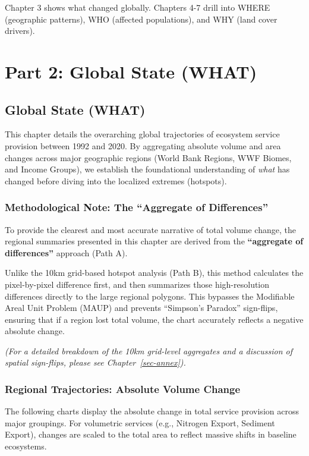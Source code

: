 \documentclass[
  letterpaper,
  DIV=11,
  numbers=noendperiod]{scrreprt}
\begin{document}
Chapter 3 shows what changed globally. Chapters 4-7 drill into WHERE
(geographic patterns), WHO (affected populations), and WHY (land cover
drivers).

\part{Part 2: Global State (WHAT)}

\chapter{Global State (WHAT)}\label{sec-what}

This chapter details the overarching global trajectories of ecosystem
service provision between 1992 and 2020. By aggregating absolute volume
and area changes across major geographic regions (World Bank Regions,
WWF Biomes, and Income Groups), we establish the foundational
understanding of \emph{what} has changed before diving into the
localized extremes (hotspots).

\section{Methodological Note: The ``Aggregate of
Differences''}\label{methodological-note-the-aggregate-of-differences}

To provide the clearest and most accurate narrative of total volume
change, the regional summaries presented in this chapter are derived
from the \textbf{``aggregate of differences''} approach (Path A).

Unlike the 10km grid-based hotspot analysis (Path B), this method
calculates the pixel-by-pixel difference first, and then summarizes
those high-resolution differences directly to the large regional
polygons. This bypasses the Modifiable Areal Unit Problem (MAUP) and
prevents ``Simpson's Paradox'' sign-flips, ensuring that if a region
lost total volume, the chart accurately reflects a negative absolute
change.

\emph{(For a detailed breakdown of the 10km grid-level aggregates and a
discussion of spatial sign-flips, please see Chapter~\ref{sec-annex}).}

\section{Regional Trajectories: Absolute Volume
Change}\label{regional-trajectories-absolute-volume-change}

The following charts display the absolute change in total service
provision across major groupings. For volumetric services (e.g.,
Nitrogen Export, Sediment Export), changes are scaled to the total area
to reflect massive shifts in baseline ecosystems.
\end{document}
